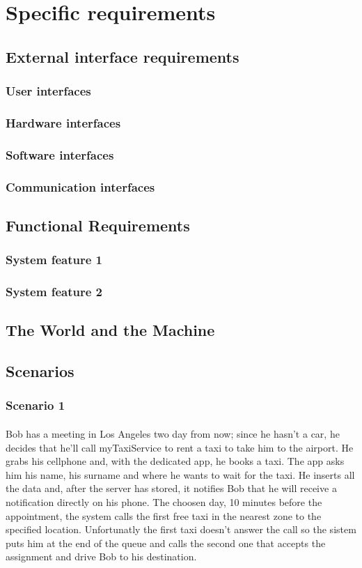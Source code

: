 \section{Specific requirements}
	\subsection{External interface requirements}
		\subsubsection{User interfaces}
		\subsubsection{Hardware interfaces}
		\subsubsection{Software interfaces}
		\subsubsection{Communication interfaces}
	\subsection{Functional Requirements}
		\subsubsection{System feature 1}
		\subsubsection{System feature 2}
	\subsection{The World and the Machine}
	\subsection{Scenarios}
		\subsubsection{Scenario 1}
		\paragraph*{}Bob has a meeting in Los Angeles two day from now; since he hasn't a car, he decides that he'll call myTaxiService to rent a taxi to take him to the airport. He grabs his cellphone and, with the dedicated app, he books a taxi. The app asks him his name, his surname and where he wants to wait for the taxi. He inserts all the data and, after the server has stored, it notifies Bob that he will receive a notification directly on his phone. The choosen day, 10 minutes before the appointment, the system calls the first free taxi in the nearest zone to the specified location. Unfortunatly the first taxi doesn't answer the call so the sistem puts him at the end of the queue and calls the second one that accepts the assignment and drive Bob to his destination.
		
